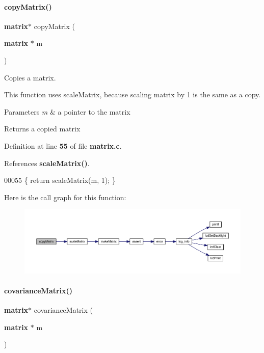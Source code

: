 \paragraph{copy\+Matrix()}
{\footnotesize\ttfamily \textbf{ matrix}$\ast$ copy\+Matrix (\begin{DoxyParamCaption}\item[{\textbf{ matrix} $\ast$}]{m }\end{DoxyParamCaption})}



Copies a matrix. 

This function uses scale\+Matrix, because scaling matrix by 1 is the same as a copy.


\begin{DoxyParams}{Parameters}
{\em m} & a pointer to the matrix \\
\hline
\end{DoxyParams}
\begin{DoxyReturn}{Returns}
a copied matrix 
\end{DoxyReturn}


Definition at line \textbf{ 55} of file \textbf{ matrix.\+c}.



References \textbf{ scale\+Matrix()}.


\begin{DoxyCode}
00055 \{ \textcolor{keywordflow}{return} scaleMatrix(m, 1); \}
\end{DoxyCode}
Here is the call graph for this function\+:
\nopagebreak
\begin{figure}[H]
\begin{center}
\leavevmode
\includegraphics[width=350pt]{matrix_8h_abbb8d2d20c2dd53a2269d017a336668f_cgraph}
\end{center}
\end{figure}
\mbox{\label{matrix_8h_ae6dab569959c360cf165136a3b625edd}} 
\paragraph{covariance\+Matrix()}
{\footnotesize\ttfamily \textbf{ matrix}$\ast$ covariance\+Matrix (\begin{DoxyParamCaption}\item[{\textbf{ matrix} $\ast$}]{m }\end{DoxyParamCaption})}




